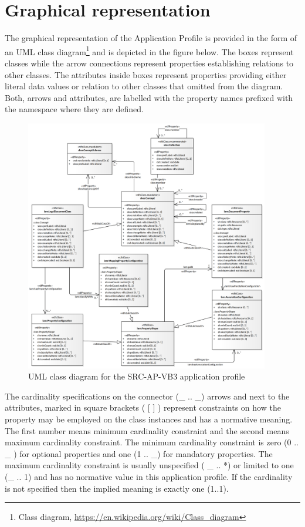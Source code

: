 
\section{Graphical representation}
\label{ariaid-title3}

The graphical representation of the Application Profile is provided in
the form of an UML class
diagram\footnote{Class diagram,
	\url{https://en.wikipedia.org/wiki/Class_diagram}} and is depicted
in the figure below. The boxes represent classes while the arrow
connections represent properties establishing relations to other
classes. The attributes inside boxes represent properties providing
either literal data values or relation to other classes that omitted
from the diagram. Both, arrows and attributes, are labelled with the
property names prefixed with the namespace where they are defined.

\begin{figure}[!ht]
	\centering
	\includegraphics[width=0.95\textwidth]{images/lam-skos-ap-2021.png}
	\caption{UML class diagram for the SRC-AP-VB3 application profile}
\end{figure}

The cardinality specifications on the connector (\_ .. \_) arrows and
next to the attributes, marked in square brackets ( {[} {]} ) represent
constraints on how the property may be employed on the class instances
and has a normative meaning. The first number means minimum cardinality
constraint and the second means maximum cardinality constraint. The
minimum cardinality constraint is zero (0 .. \_ ) for optional
properties and one (1 .. \_) for mandatory properties. The maximum
cardinality constraint is usually unspecified ( \_ .. *) or limited to
one (\_ .. 1) and has no normative value in this application profile. If
the cardinality is not specified then the implied meaning is exactly one
(1..1).

